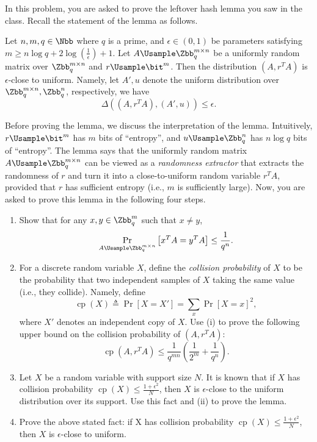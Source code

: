 \begin{problem}\label{p2}
    \leavevmode\par
    In this problem, you are asked to prove the leftover hash lemma you saw in the class. Recall the statement of the lemma as follows.
    \begin{theorem}\label{lemma:leftover-hash-lemma}
        Let $n,m,q\in \Nbb$ where $q$ is a prime, and $\epsilon \in (0,1)$ be parameters satisfying $m\ge n\log{q} + 2\log (\frac{1}\epsilon) +1$. Let $A\Usample \Zbb_q^{m\times n}$ be a uniformly random matrix over  $\Zbb_q^{m\times n}$ and $r\Usample\bit^m$. Then the distribution $(A, r^T A)$ is $\epsilon$-close to uniform. Namely, let  $A', u$ denote the uniform distribution over $\Zbb_q^{m\times n}, \Zbb_q^n$, respectively, we have
        \[
            \Delta((A, r^T A), (A', u)) \le \epsilon.
        \]
    \end{theorem}
    Before proving the lemma, we discuss the interpretation of the lemma. Intuitively, $r\Usample\bit^m$ has $m$ bits of ``entropy'', and $u\Usample\Zbb_q^n$ has $n\log q$ bits of ``entropy''. The lemma says that the uniformly random matrix $A\Usample \Zbb_q^{m\times n}$ can be viewed as a \textit{randomness extractor} that extracts the randomness of $r$ and turn it into a close-to-uniform random variable $r^TA$, provided that $r$ has sufficient entropy (i.e., $m$ is sufficiently large). Now, you are asked to prove this lemma in the following four steps.
    \begin{enumerate}[label=(\roman*)]
        \item Show that for any $x,y\in \Zbb_q^m$ such that $x\ne y$,
        \[
            \Pr_{A\Usample \Zbb_q^{m\times n}}\left[x^T A = y^TA\right] \le \frac{1}{q^n}.
        \]
        \item For a discrete random variable $X$, define the \textit{collision probability} of $X$ to be the probability that two independent samples of $X$ taking the same value (i.e., they collide). Namely, define 
        \[
            \mathop{\textrm{cp}}(X) \triangleq \Pr[X=X'] = \sum_x \Pr[X=x]^2,
        \]
        where $X'$ denotes an independent copy of $X$. Use (i) to prove the following upper bound on the collision probability of $(A, r^TA)$:
        \[
            \mathop{\textrm{cp}}(A, r^TA) \le \frac{1}{q^{mn}}\left(\frac{1}{2^m}+\frac{1}{q^n}\right).
        \]
        \item Let $X$ be a random variable with support size $N$. It is known that if $X$ has collision probability $\mathop{\textrm{cp}}(X)\le \frac{1+\epsilon^2}{N}$, then $X$ is $\epsilon$-close to the uniform distribution over its support. Use this fact and (ii) to prove the lemma.
        \item Prove the above stated fact: if X has collision probability $\mathop{\textrm{cp}}(X)\le \frac{1+\epsilon^2}{N}$, then $X$ is $\epsilon$-close to uniform.
    \end{enumerate}
\end{problem}



